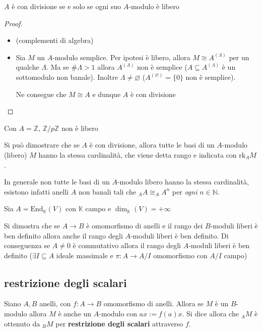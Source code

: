 \begin{proposition}{}
    \(A\) è con divisione se e solo se ogni suo \(A\)-modulo è libero
\end{proposition}
\begin{proof}\( \)
\begin{itemize}
    \item[\(\implies \)] (complementi di algebra)
    \item[\(\impliedby \)] Sia \(M\) un \(A\)-modulo semplice. Per ipotesi è
        libero, allora \(M \cong A^{{(\Lambda)}}\) per un qualche \(\Lambda\).
        Ma se \(\# \Lambda > 1\) allora \(A^{{(\Lambda)}}\) non è semplice (\(A \subseteq A^{{(\Lambda)}} \) è un sottomodulo non banale). Inoltre \(\Lambda\neq \varnothing\) (\(A^{{(\varnothing)}} = \{0\} \) non è semplice).

        Ne consegue che \(M\cong A\) e dunque \(A\) è con divisione 
\end{itemize}
\end{proof}
\begin{example}{}
    Con \(A = \mathbb{Z}\), \(\mathbb{Z} / p \mathbb{Z}\) non è libero
\end{example}

Si può dimostrare che se \(A\) è con divisione, allora tutte le basi di un \(A\)-modulo (libero) \(M\) hanno la stessa cardinalità, che viene detta rango e indicata con \(\mathrm{rk}_A M\).

In generale non tutte le basi di un \(A\)-modulo libero hanno la stessa
cardinalità, esistono infatti anelli \(A\) non banali tali che \({}_{A}{A} \cong _AA
^{n}\) per \emph{ogni} \(n \in \mathbb{N}\).

\begin{example}{}
    Sia \(A = \mathrm{End}_{\mathbb{K}} {(V)}\) con \(\mathbb{K}\) campo e \(\dim_{\mathbb{K}} {(V)} = +\infty\) 
\end{example}


Si dimostra che se \(A \to  B\) è omomorfismo di anelli e il rango dei \(B\)-moduli
liberi è ben definito allora anche il rango degli \(A\)-moduli liberi è ben
definito. Di conseguenza se \(A\neq 0 \) è commutativo allora il rango degli \(A\)-moduli liberi è ben definito (\(\exists I \subseteq A \) ideale massimale e \(\pi : A \to A/I\) omomorfismo con \(A / I\) campo)

\subsection{restrizione degli scalari}
Siano \(A, B\) anelli, con \(f : A \to B\) omomorfismo di anelli. Allora se \(M\) è un \(B\)-modulo allora \(M\) è anche un \(A\)-modulo con \(ax := f{(a)}x\). Si dice allora che \(
_A M\) è ottenuto da \(_B M\) per \textbf{restrizione degli scalari} attraverso
\(f\).

